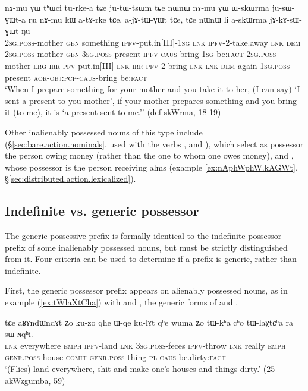 \begin{exe}
\ex \label{ex:askWrma}
\gll nɤ-mu ɣɯ tʰɯci tu-rke-a tɕe ju-tɯ-tsɯm tɕe nɯnɯ nɤ-mu ɣɯ ɯ-skɯrma ju-sɯ-ɣɯt-a ŋu nɤ-mu kɯ a-tɤ-rke tɕe, a-jɤ-tɯ-ɣɯt tɕe, tɕe nɯnɯ li a-skɯrma jɤ-kɤ-sɯ-ɣɯt ŋu \\
\textsc{2sg}.\textsc{poss}-mother \textsc{gen} something \textsc{ipfv}-put.in[III]-\textsc{1sg} \textsc{lnk} \textsc{ipfv}-2-take.away \textsc{lnk} \textsc{dem} \textsc{2sg}.\textsc{poss}-mother \textsc{gen} \textsc{3sg}.\textsc{poss}-present  \textsc{ipfv}-\textsc{caus}-bring-\textsc{1sg} be:\textsc{fact} \textsc{2sg}.\textsc{poss}-mother  \textsc{erg} \textsc{irr}-\textsc{pfv}-put.in[III] \textsc{lnk} \textsc{irr}-\textsc{pfv}-2-bring \textsc{lnk} \textsc{lnk} \textsc{dem} again \textsc{1sg}.\textsc{poss}-present \textsc{aor}-\textsc{obj}:\textsc{pcp}-\textsc{caus}-bring be:\textsc{fact} \\
\glt `When I prepare something for your mother and you take it to her, (I can say) `I sent a present to you mother', if your mother prepares something and you bring it (to me), it is `a present sent to me.'' (def-skWrma, 18-19)
\end{exe}

Other inalienably possessed nouns of this type include  (§\ref{sec:bare.action.nominals}, used with the verbs ,  and ), which select as possessor the person owing money (rather than the one to whom one owes money), and , whose possessor is the person receiving alms (example \ref{ex:nAphWphW.kAGWt}, §\ref{sec:distributed.action.lexicalized}).

\subsection{Indefinite vs. generic possessor} \label{sec:indef.genr.poss}
The generic possessive prefix  is formally identical to the indefinite possessor prefix of some inalienably possessed nouns, but must be strictly distinguished from it. Four criteria can be used to determine if a  prefix is generic, rather than indefinite.

First, the generic possessor prefix appears on alienably possessed nouns, as in example (\ref{ex:tWlaXtCha}) with  and , the generic forms of  and .

\begin{exe}
\ex \label{ex:tWlaXtCha}
\gll tɕe  	aʁɤndɯndɤt  	ʑo  	ku-zo  	qhe  	ɯ-qe  	ku-lɤt  	qʰe	wuma  ʑo  	tɯ-kʰa  	cʰo  	tɯ-laχtɕʰa  	ra  	sɯ-ɴqʰi.  \\
\textsc{lnk} everywhere \textsc{emph} \textsc{ipfv}-land \textsc{lnk} \textsc{3sg}.\textsc{poss}-feces \textsc{ipfv}-throw \textsc{lnk} really \textsc{emph} \textsc{genr}.\textsc{poss}-house \textsc{comit} \textsc{genr}.\textsc{poss}-thing \textsc{pl} \textsc{caus}-be.dirty:\textsc{fact} \\
\glt `(Flies) land everywhere, shit and make one's houses and things dirty.' (25 akWzgumba, 59)
\end{exe}

